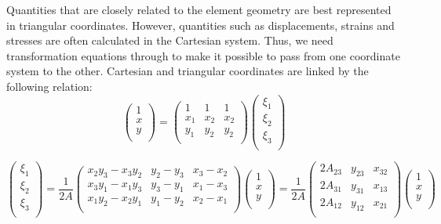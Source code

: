Quantities that are closely related to the element geometry are best represented in triangular coordinates. However, quantities such as displacements, strains and stresses are often calculated in the Cartesian system. Thus, we need transformation equations through to make it possible to pass from one coordinate system to the other. Cartesian and triangular coordinates are linked by the following relation:
\begin{equation}
\begin{pmatrix}
1 \\
x \\
y \\
\end{pmatrix}
= 
\begin{pmatrix}
1&1&1 \\
x_1&x_2&x_2 \\
y_1&y_2&y_2 \\
\end{pmatrix}
\begin{pmatrix}
\xi_1 \\
\xi_2 \\
\xi_3 \\
\end{pmatrix}
\end{equation}

\begin{equation}
\begin{pmatrix}
\xi_1 \\
\xi_2 \\
\xi_3 \\
\end{pmatrix}
= 
\frac{1}{2A}\begin{pmatrix}
x_2y_3-x_3y_2&y_2-y_3&x_3-x_2 \\
x_3y_1-x_1y_3&y_3-y_1&x_1-x_3 \\
x_1y_2-x_2y_1&y_1-y_2&x_2-x_1 \\
\end{pmatrix}
\begin{pmatrix}
1\\
x \\
y \\
\end{pmatrix}
= 
\frac{1}{2A}\begin{pmatrix}
2A_{23}&y_{23}&x_{32} \\
2A_{31}&y_{31}&x_{13} \\
2A_{12}&y_{12}&x_{21} \\
\end{pmatrix}
\begin{pmatrix}
1 \\
x \\
y \\

\end{pmatrix}
\end{equation}


